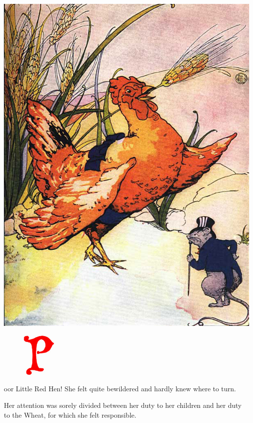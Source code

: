\documentclass[letterpaper, 10pt, openany]{memoir}
\begin{document}
\newpage
\begin{center}
	\includegraphics[width=\textwidth]{image_048_1.jpg}
\end{center}

\newpage
\begin{figure}
	\includegraphics[width=0.15\textwidth]{image_020.jpg}
\end{figure}

oor Little Red Hen! She felt quite bewildered and hardly knew where to turn.

\vspace{\onelineskip}

Her attention was sorely divided between her duty to her children and her duty to the Wheat,
for which she felt responsible.
\end{document}
